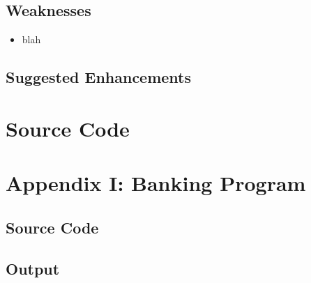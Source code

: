 \documentclass{report}
\begin{document}
        \section{Weaknesses}
        \begin{itemize}
            \item blah
        \end{itemize}
        
        \section{Suggested Enhancements}
    
    \chapter{Source Code}

\chapter*{Appendix I: Banking Program}
\section{Source Code}
\section{Output}
\end{document}
